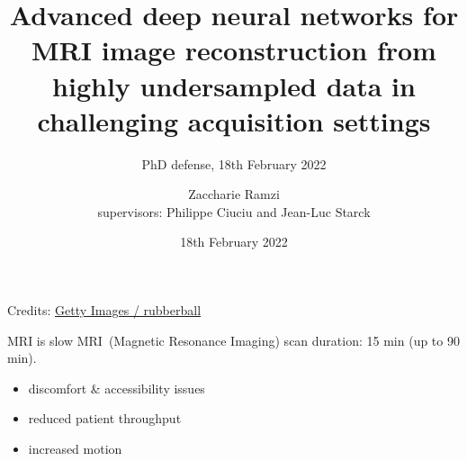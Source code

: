 \documentclass[aspectratio=169,xcolor=dvipsnames]{beamer}
\title[Advanced deep neural networks for MRI image reconstruction]{Advanced deep neural networks for MRI image reconstruction from highly undersampled data in challenging acquisition settings
} %
\subtitle{PhD defense, 18th February 2022}
\author[Zaccharie] {Zaccharie Ramzi \\  {\footnotesize supervisors: Philippe Ciuciu and Jean-Luc Starck}}
\institute[Inria-CEA] %
{
    Parietal team, Inria Saclay \\
    NeuroSpin and Cosmostat, CEA Saclay
}
\date{18th February 2022} %
\begin{document}
\begin{frame}
    \titlepage
\end{frame}

{
\begin{frame}[plain]
    \href{run:Sounds/mri_sounds.mp3}{\faPlayCircle}
    \begin{minipage}[t][.8\textheight]{\textwidth}    
        \vfill
        
        \tiny
        Credits: \href{https://www.francetvinfo.fr/sante/malgre-l-augmentation-des-besoins-medicaux-le-deficit-en-france-d-appareils-irm-se-fait-de-plus-en-plus-sentir_220301.html}{Getty Images / rubberball}
      \end{minipage}
\end{frame}
}

\begin{frame}{MRI is slow}
    MRI~(Magnetic Resonance Imaging) scan duration: 15 min (up to 90 min).
    \begin{itemize}
        \item discomfort \& accessibility issues
        \item reduced patient throughput
        \item increased motion
    \end{itemize}
\end{frame}
\end{document}
